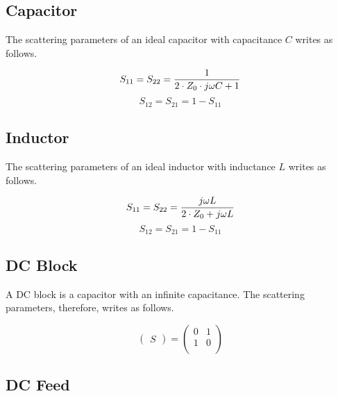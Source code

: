 \documentclass[10pt]{report}
\begin{document}
\subsection{Capacitor}

The scattering parameters of an ideal capacitor with capacitance $C$
writes as follows.

\begin{equation}
S_{11} = S_{22} = \frac{1}{2\cdot Z_0\cdot j\omega C+1} \\
\end{equation}
\begin{equation}
S_{12} = S_{21} = 1-S_{11}
\end{equation}

\subsection{Inductor}

The scattering parameters of an ideal inductor with inductance $L$
writes as follows.

\begin{equation}
S_{11} = S_{22} = \frac{j\omega L}{2\cdot Z_0 + j\omega L} \\
\end{equation}
\begin{equation}
S_{12} = S_{21} = 1-S_{11}
\end{equation}

\subsection{DC Block}

A DC block is a capacitor with an infinite capacitance.  The
scattering parameters, therefore, writes as follows.

\begin{equation}
\begin{pmatrix}
S
\end{pmatrix}
=
\begin{pmatrix}
0 & 1\\
1 & 0\\
\end{pmatrix}
\end{equation}

\subsection{DC Feed}
\end{document}
